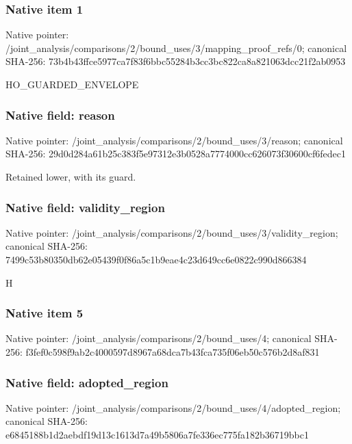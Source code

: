 \documentclass[10pt,a4paper]{article}
\begin{document}
\subsubsection{Native item 1}
Native pointer: /joint\_\allowbreak{}analysis/comparisons/2/bound\_\allowbreak{}uses/3/mapping\_\allowbreak{}proof\_\allowbreak{}refs/0; canonical SHA-256: 73b4b43ffce5977ca7f83f6bbc55284b3cc3bc822ca8a821063dcc21f2ab0953

\begingroup\raggedright\sloppy HO\_\allowbreak{}GUARDED\_\allowbreak{}ENVELOPE\par\endgroup

\subsubsection{Native field: reason}
Native pointer: /joint\_\allowbreak{}analysis/comparisons/2/bound\_\allowbreak{}uses/3/reason; canonical SHA-256: 29d0d284a61b25c383f5e97312e3b0528a7774000cc626073f30600cf6fedec1

\begingroup\raggedright\sloppy Retained lower,\allowbreak{} with its guard.\par\endgroup

\subsubsection{Native field: validity\_\allowbreak{}region}
Native pointer: /joint\_\allowbreak{}analysis/comparisons/2/bound\_\allowbreak{}uses/3/validity\_\allowbreak{}region; canonical SHA-256: 7499c53b80350db62e05439f0f86a5c1b9eae4c23d649cc6e0822c990d866384

\begingroup\raggedright\sloppy H\par\endgroup

\subsubsection{Native item 5}
Native pointer: /joint\_\allowbreak{}analysis/comparisons/2/bound\_\allowbreak{}uses/4; canonical SHA-256: f3fef0c598f9ab2c4000597d8967a68dca7b43fca735f06eb50c576b2d8af831

\subsubsection{Native field: adopted\_\allowbreak{}region}
Native pointer: /joint\_\allowbreak{}analysis/comparisons/2/bound\_\allowbreak{}uses/4/adopted\_\allowbreak{}region; canonical SHA-256: e6845188b1d2aebdf19d13c1613d7a49b5806a7fe336ec775fa182b36719bbc1
\end{document}
